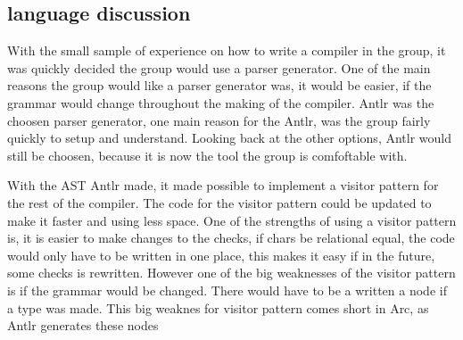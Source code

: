 \subsection*{language discussion}
    With the small sample of experience on how to write a compiler in the group, it was quickly decided the group would use a parser generator. One of the main reasons the group would like a parser generator was, it would be easier, if the grammar would change throughout the making of the compiler. Antlr was the choosen parser generator, one main reason for the Antlr, was the group fairly quickly to setup and understand. Looking back at the other options, Antlr would still be choosen, because it is now the tool the group is comfoftable with.  

    With the AST Antlr made, it made possible to implement a visitor pattern for the rest of the compiler. The code for the visitor pattern could be updated to make it faster and using less space. One of the strengths of using a visitor pattern is, it is easier to make changes to the checks, if chars be relational equal, the code would only have to be written in one place, this makes it easy if in the future, some checks is rewritten. However one of the big weaknesses of the visitor pattern is if the grammar would be changed. There would have to be a written a node if a type was made. This big weaknes for visitor pattern comes short in Arc, as Antlr generates these nodes 